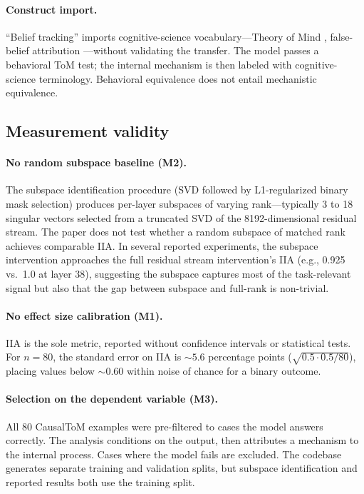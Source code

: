 \documentclass[11pt]{article}
\begin{document}
\paragraph{Construct import.}
``Belief tracking'' imports cognitive-science vocabulary---Theory of Mind \citep{premack1978chimpanzee}, false-belief attribution \citep{wimmer1983beliefs}---without validating the transfer. The model passes a behavioral ToM test; the internal mechanism is then labeled with cognitive-science terminology. Behavioral equivalence does not entail mechanistic equivalence.

\subsection{Measurement validity}

\paragraph{No random subspace baseline (M2).}
The subspace identification procedure (SVD followed by L1-regularized binary mask selection) produces per-layer subspaces of varying rank---typically 3 to 18 singular vectors selected from a truncated SVD of the 8192-dimensional residual stream. The paper does not test whether a random subspace of matched rank achieves comparable IIA. In several reported experiments, the subspace intervention approaches the full residual stream intervention's IIA (e.g., 0.925 vs.\ 1.0 at layer 38), suggesting the subspace captures most of the task-relevant signal but also that the gap between subspace and full-rank is non-trivial.

\paragraph{No effect size calibration (M1).}
IIA is the sole metric, reported without confidence intervals or statistical tests. For $n = 80$, the standard error on IIA is ${\sim}5.6$ percentage points ($\sqrt{0.5 \cdot 0.5 / 80}$), placing values below ${\sim}0.60$ within noise of chance for a binary outcome.

\paragraph{Selection on the dependent variable (M3).}
All 80 CausalToM examples were pre-filtered to cases the model answers correctly. The analysis conditions on the output, then attributes a mechanism to the internal process. Cases where the model fails are excluded. The codebase generates separate training and validation splits, but subspace identification and reported results both use the training split.
\end{document}
